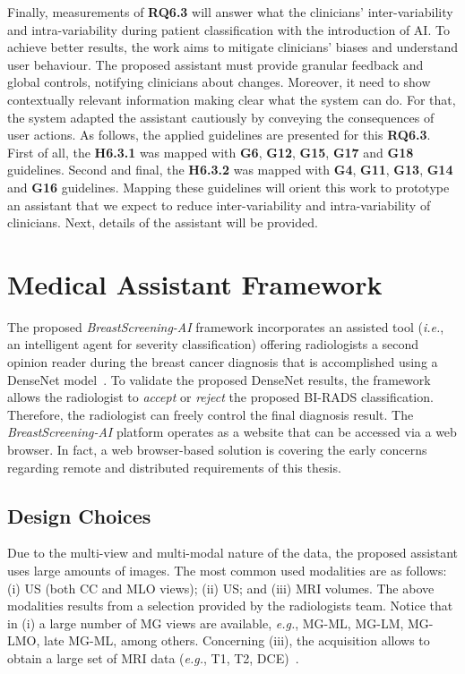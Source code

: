 Finally, measurements of {\bf RQ6.3} will answer what the clinicians' inter-variability and intra-variability during patient classification with the introduction of \ac{AI}.
To achieve better results, the work aims to mitigate clinicians' biases and understand user behaviour.
The proposed assistant must provide granular feedback and global controls, notifying clinicians about changes.
Moreover, it need to show contextually relevant information making clear what the system can do.
For that, the system adapted the assistant cautiously by conveying the consequences of user actions.
As follows, the applied guidelines are presented for this {\bf RQ6.3}.
First of all, the {\bf H6.3.1} was mapped with {\bf G6}, {\bf G12}, {\bf G15}, {\bf G17} and {\bf G18} guidelines.
Second and final, the {\bf H6.3.2} was mapped with {\bf G4}, {\bf G11}, {\bf G13}, {\bf G14} and {\bf G16} guidelines.
Mapping these guidelines will orient this work to prototype an assistant that we expect to reduce inter-variability and intra-variability of clinicians.
Next, details of the assistant will be provided.

\section{Medical Assistant Framework}
\label{sec:app002004}

The proposed {\it BreastScreening-AI} framework incorporates an assisted tool ({\it i.e.}, an intelligent agent for severity classification) offering radiologists a second opinion reader during the breast cancer diagnosis that is accomplished  using  a DenseNet model~\cite{chen2019learning}.
To validate the proposed DenseNet results, the framework allows the radiologist to {\it accept} or {\it reject} the proposed \ac{BI-RADS} classification.
Therefore, the radiologist can freely control the final diagnosis result.
The {\it BreastScreening-AI} platform operates as a website that can be accessed via a web browser.
In fact, a web browser-based solution is covering the early concerns regarding remote and distributed requirements of this thesis.

\subsection{Design Choices}
\label{sec:app002004001}

Due to the multi-view and multi-modal nature of the data, the proposed assistant uses large amounts of images.
The most common used modalities are as follows:
(i) \ac{US} (both \ac{CC} and \ac{MLO} views);
(ii) \ac{US}; and
(iii) \ac{MRI} volumes.
The above modalities results from a selection provided by the radiologists team.
Notice that in (i) a large number of \ac{MG} views are available, {\it e.g.}, MG-ML, MG-LM, MG-LMO, late MG-ML, among others.
Concerning (iii), the acquisition allows to obtain a large set of \ac{MRI} data ({\it e.g.}, T1, T2, \ac{DCE})~\cite{seifabadi2019correlation}.

